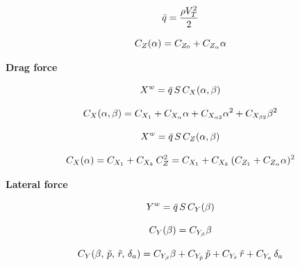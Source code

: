\begin{equation}{\label{eqn:dynamicPressure}}
\bar{q} = \frac{\rho V_T^2}{2} 
\end{equation}

\begin{equation}{\label{eqn:liftCoef}}
C_Z(\alpha) = C_{Z_0} + C_{Z_{\alpha}} \alpha 
\end{equation}



\textbf{Drag force}

\begin{equation}{\label{eqn:dragForceETHcraft}}
X^w = \bar{q} \, S \,  C_X(\alpha, \beta)
\end{equation}

\begin{equation}{\label{eqn:dragCoeffETHcraft}}
C_X(\alpha, \beta) = C_{X_1} + C_{X_{\alpha}} \alpha + C_{X_{\alpha 2}} {\alpha}^2 + C_{X_{\beta 2}} {\beta}^2 
\end{equation}

\begin{equation}{\label{eqn:dragForceMAKO}}
X^w = \bar{q} \, S \, C_{Z}(\alpha, \beta)
\end{equation}

\begin{equation}{\label{eqn:dragCoeffMAKO}}
C_X(\alpha) = C_{X_1} + C_{X_k} \, C_Z^2 = C_{X_1} + C_{X_k} \, (C_{Z_1} + C_{Z_{\alpha}} \alpha )^2
\end{equation}


\textbf{Lateral force}

\begin{equation}{\label{eqn:lateralForceETHcraft}}
Y^w = \bar{q} \, S \,  C_Y(\beta)
\end{equation}

\begin{equation}{\label{eqn:lateralCoeffETHcraft}}
C_Y(\beta) = C_{Y_\beta} \beta
\end{equation}

\begin{equation}{\label{eqn:lateralCoeffMAKO}}
C_Y(\beta, \, \tilde{p}, \, \tilde{r}, \, \delta_a) = C_{Y_\beta} \beta + C_{Y_{\tilde{p}}} \, \tilde{p} + C_{Y_{\tilde{r}}} \, \tilde{r} + C_{Y_a} \, \delta_a 
\end{equation}


